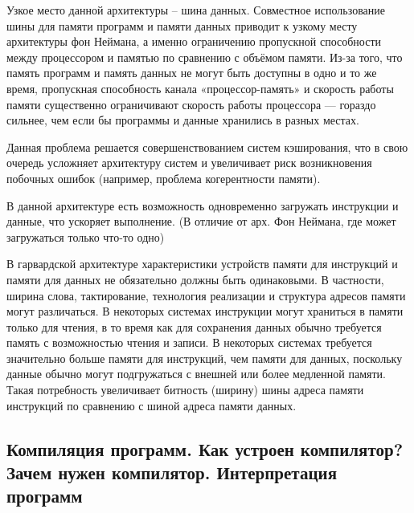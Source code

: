 \documentclass{article}
\begin{document}
Узкое место данной архитектуры -- шина данных. Совместное использование шины для памяти программ и памяти данных приводит к узкому месту архитектуры фон Неймана, а именно ограничению пропускной способности между процессором и памятью по сравнению с объёмом памяти. Из-за того, что память программ и память данных не могут быть доступны в одно и то же время, пропускная способность канала «процессор-память» и скорость работы памяти существенно ограничивают скорость работы процессора — гораздо сильнее, чем если бы программы и данные хранились в разных местах.

Данная проблема решается совершенствованием систем кэширования, что в свою очередь усложняет архитектуру систем и увеличивает риск возникновения побочных ошибок (например, проблема когерентности памяти).


В данной архитектуре есть возможность одновременно загружать инструкции и данные, что ускоряет выполнение. (В отличие от арх. Фон Неймана, где может загружаться только что-то одно)

В гарвардской архитектуре характеристики устройств памяти для инструкций и памяти для данных не обязательно должны быть одинаковыми. В частности, ширина слова, тактирование, технология реализации и структура адресов памяти могут различаться. В некоторых системах инструкции могут храниться в памяти только для чтения, в то время как для сохранения данных обычно требуется память с возможностью чтения и записи. В некоторых системах требуется значительно больше памяти для инструкций, чем памяти для данных, поскольку данные обычно могут подгружаться с внешней или более медленной памяти. Такая потребность увеличивает битность (ширину) шины адреса памяти инструкций по сравнению с шиной адреса памяти данных.

\subsection{Компиляция программ. Как устроен компилятор? Зачем нужен
компилятор. Интерпретация программ}

\end{document}
